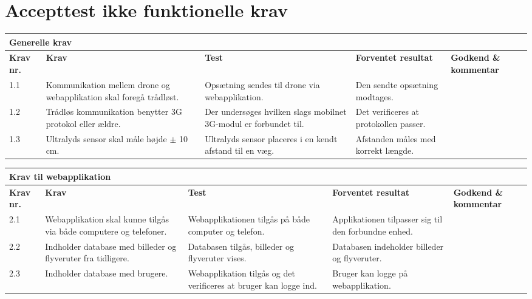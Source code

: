 \section{Accepttest ikke funktionelle krav}


    \centering
    \begin{tabular}{|p{}|p{3.2 cm}|p{3.2 cm}|p{3.2 cm}|p{2.2 cm}|}
			\hline
			\multicolumn{5}{|l|}{\textbf{{\large Generelle krav}}}\\ \hline
			\textbf{Krav nr.} & \textbf{Krav} & \textbf{Test} & \textbf{Forventet \newline resultat} & 			
			\textbf{Godkend \& \newline kommentar} \\ \hline
			
			1.1 & Kommunikation mellem drone og webapplikation skal foregå trådløst.
				& Opsætning sendes til drone via webapplikation.
				& Den sendte opsætning modtages.
				& \\ \hline

			1.2 & Trådløs kommunikation benytter 3G protokol eller ældre. 
				& Der undersøges hvilken slags mobilnet 3G-modul er forbundet til.
				& Det verificeres at protokollen passer.
				&  \\ \hline
			
			1.3 & Ultralyds sensor skal måle højde $\pm$ 10 cm.
				& Ultralyds sensor placeres i en kendt afstand til en væg.
				& Afstanden måles med korrekt længde.
				& \\ \hline						
		\end{tabular}

\vspace{2cm}

    \centering
    \begin{tabular}{|p{}|p{3.2 cm}|p{3.2 cm}|p{3.2 cm}|p{2.2 cm}|}
			\hline
			\multicolumn{5}{|l|}{\textbf{{\large Krav til webapplikation}}}\\ \hline
			\textbf{Krav nr.} & \textbf{Krav} & \textbf{Test} & \textbf{Forventet \newline resultat} & 			
			\textbf{Godkend \& \newline kommentar} \\ \hline
			
			2.1 & Webapplikation skal kunne tilgås via både computere og telefoner.
				& Webapplikationen tilgås på både computer og telefon.
				& Applikationen tilpasser sig til den forbundne enhed.
				& \\ \hline

			2.2 & Indholder database med billeder og flyveruter fra tidligere. 
				& Databasen tilgås, billeder og flyveruter vises.
				& Databasen indeholder billeder og flyveruter.
				&  \\ \hline
			
			2.3 & Indholder database med brugere.
				& Webapplikation tilgås og det verificeres at bruger kan logge ind.
				& Bruger kan logge på webapplikation.
				& \\ \hline				
		\end{tabular}
	\label{tab:krav_1}



